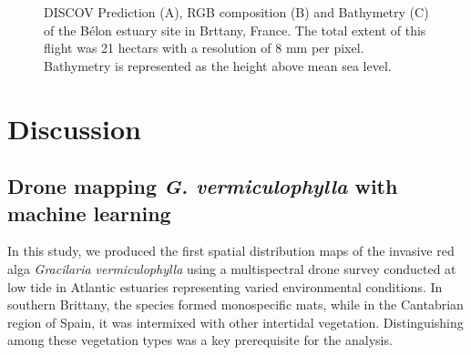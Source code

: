 \documentclass[
  letterpaper,
  DIV=11,
  numbers=noendperiod]{scrartcl}
\begin{document}
\label{cell-fig-Gam_Slope}
\begin{figure}[H]


\caption{\label{fig-Gam_Slope}DISCOV Prediction (A), RGB composition (B)
and Bathymetry (C) of the Bélon estuary site in Brttany, France. The
total extent of this flight was 21 hectars with a resolution of 8 mm per
pixel. Bathymetry is represented as the height above mean sea level.}

\end{figure}%

\section{Discussion}\label{discussion}

\subsection{\texorpdfstring{Drone mapping \emph{G. vermiculophylla} with
machine
learning}{Drone mapping G. vermiculophylla with machine learning}}\label{drone-mapping-g.-vermiculophylla-with-machine-learning}

In this study, we produced the first spatial distribution maps of the
invasive red alga \emph{Gracilaria vermiculophylla} using a
multispectral drone survey conducted at low tide in Atlantic estuaries
representing varied environmental conditions. In southern Brittany, the
species formed monospecific mats, while in the Cantabrian region of
Spain, it was intermixed with other intertidal vegetation.
Distinguishing among these vegetation types was a key prerequisite for
the analysis.
\end{document}

